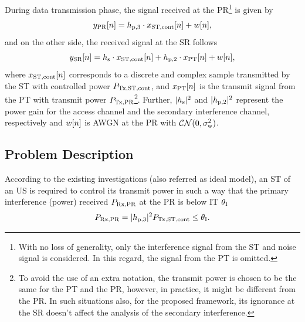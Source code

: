 During data transmission phase, the signal received at the PR\footnote{With no loss of generality, only the interference signal from the ST and noise signal is considered. In this regard, the signal from the PT is omitted.} is given by
\begin{equation}
y_{\text{PR}}[n] = h_{\text{p,3}}  \cdot x_{\text{ST,cont}}[n] + w[n],
\label{eq:sys_mod_pr}
\end{equation}
and on the other side, the received signal at the SR follows 
\begin{equation}
y_{\text{SR}}[n] = h_{\text{s}} \cdot x_{\text{ST,cont}}[n] + h_{\text{p,2}} \cdot x_{\text{PT}}[n] + w[n],
\label{eq:sys_mod_sr}
\end{equation}
where $x_{\text{ST,cont}}[n]$ corresponds to a discrete and complex sample transmitted by the ST with controlled power $P_{\text{Tx,ST,cont}}$, and $x_{\text{PT}}[n]$ is the transmit signal from the PT with transmit power $P_{\text{Tx,PR}}$\footnote{To avoid the use of an extra notation, the transmit power is chosen to be the same for the PT and the PR, however, in practice, it might be different from the PR. In such situations also, for the proposed framework, its ignorance at the SR doesn't affect the analysis of the secondary interference.}. Further, $|h_{\text{s}}|^2$ and $|h_{\text{p,2}}|^2$ represent the power gain for the access channel and the secondary interference channel, respectively and $w[n]$ is AWGN at the PR with $\mathcal{CN}(0, \sigma^2_{\text{w}})$. %


\subsection{Problem Description} \label{ssec:pd}
According to the existing investigations (also referred as ideal model), an ST of an US is required to control its transmit power in such a way that the primary interference (power) received $P_{\text{Rx,PR}}$ at the PR is below IT $\theta_{\text{I}}$ \cite{Xing07}
\begin{equation}
P_{\text{Rx,PR}} = |h_{\text{p,3}}|^2 P_{\text{Tx,ST,cont}} \le \theta_{\text{I}}.
\label{eq:IT_id}
\end{equation}


